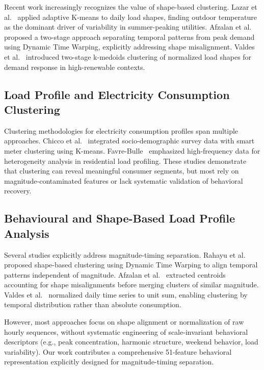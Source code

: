 \documentclass[11pt,a4paper]{article}
\begin{document}
Recent work increasingly recognizes the value of shape-based clustering. Lazar et al.~\cite{lazar2021investigating} applied adaptive K-means to daily load shapes, finding outdoor temperature as the dominant driver of variability in summer-peaking utilities. Afzalan et al.~\cite{afzalan2020twostage} proposed a two-stage approach separating temporal patterns from peak demand using Dynamic Time Warping, explicitly addressing shape misalignment. Valdes et al.~\cite{valdes2021smart} introduced two-stage k-medoids clustering of normalized load shapes for demand response in high-renewable contexts.

\subsection{Load Profile and Electricity Consumption Clustering}

Clustering methodologies for electricity consumption profiles span multiple approaches. Chicco et al.~\cite{chicco2021clustering} integrated socio-demographic survey data with smart meter clustering using K-means. Favre-Bulle~\cite{favre-bulle2024clustering} emphasized high-frequency data for heterogeneity analysis in residential load profiling. These studies demonstrate that clustering can reveal meaningful consumer segments, but most rely on magnitude-contaminated features or lack systematic validation of behavioral recovery.

\subsection{Behavioural and Shape-Based Load Profile Analysis}

Several studies explicitly address magnitude-timing separation. Rahayu et al.~\cite{rahayu2021shape} proposed shape-based clustering using Dynamic Time Warping to align temporal patterns independent of magnitude. Afzalan et al.~\cite{afzalan2020twostage} extracted centroids accounting for shape misalignments before merging clusters of similar magnitude. Valdes et al.~\cite{valdes2021smart} normalized daily time series to unit sum, enabling clustering by temporal distribution rather than absolute consumption.

However, most approaches focus on shape alignment or normalization of raw hourly sequences, without systematic engineering of scale-invariant behavioral descriptors (e.g., peak concentration, harmonic structure, weekend behavior, load variability). Our work contributes a comprehensive 51-feature behavioral representation explicitly designed for magnitude-timing separation.
\end{document}
